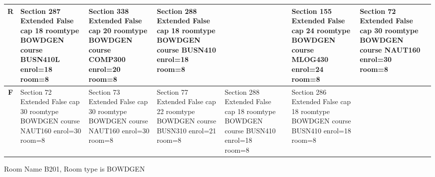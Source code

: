 \documentclass{article} \usepackage[margin=0.5in]{geometry}
\newcommand{\textgr}[1]{\cellcolor{gray!40}\textbf{#1}}
\begin{document}
\begin{tabular}{|c|z|z|z|z|z|z|z|z|}
\hline
\textgr{R} &  Section 287 Extended False cap 18 roomtype BOWDGEN course BUSN410L enrol=18 room=8   & Section 338 Extended False cap 20 roomtype BOWDGEN course COMP300 enrol=20 room=8 & Section 288 Extended False cap 18 roomtype BOWDGEN course BUSN410 enrol=18 room=8 &  &  & Section 155 Extended False cap 24 roomtype BOWDGEN course MLOG430 enrol=24 room=8 & Section 72 Extended False cap 30 roomtype BOWDGEN course NAUT160 enrol=30 room=8 &  \\[65pt]
\hline
\textgr{F} &  Section 72 Extended False cap 30 roomtype BOWDGEN course NAUT160 enrol=30 room=8 & Section 73 Extended False cap 30 roomtype BOWDGEN course NAUT160 enrol=30 room=8 & Section 77 Extended False cap 22 roomtype BOWDGEN course BUSN310 enrol=21 room=8 & Section 288 Extended False cap 18 roomtype BOWDGEN course BUSN410 enrol=18 room=8 &  & Section 286 Extended False cap 18 roomtype BOWDGEN course BUSN410 enrol=18 room=8 &  &  \\[65pt]
\hline
\end{tabular}

	
Room Name B201, Room type is BOWDGEN 
\newpage
	
\end{document}
